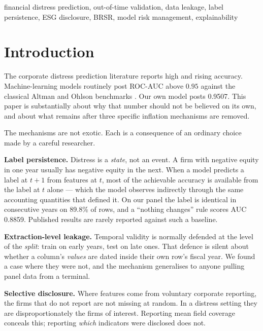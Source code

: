 \documentclass[conference]{IEEEtran}
\begin{document}
\begin{IEEEkeywords}
financial distress prediction, out-of-time validation, data leakage, label
persistence, ESG disclosure, BRSR, model risk management, explainability
\end{IEEEkeywords}

\section{Introduction}

The corporate distress prediction literature reports high and rising accuracy.
Machine-learning models routinely post ROC-AUC above $0.95$ against the
classical Altman and Ohlson benchmarks \cite{altman1968,ohlson1980,barboza2017}.
Our own model posts 0.9507. This paper is substantially about why that number
should not be believed on its own, and about what remains after three specific
inflation mechanisms are removed.

The mechanisms are not exotic. Each is a consequence of an ordinary choice made
by a careful researcher.

\textbf{Label persistence.} Distress is a \emph{state}, not an event. A firm
with negative equity in one year usually has negative equity in the next. When
a model predicts a label at $t+1$ from features at $t$, most of the achievable
accuracy is available from the label at $t$ alone --- which the model observes
indirectly through the same accounting quantities that defined it. On our panel
the label is identical in consecutive years on 89.8\% of rows, and a
``nothing changes'' rule scores AUC 0.8859. Published results are rarely
reported against such a baseline.

\textbf{Extraction-level leakage.} Temporal validity is normally defended at
the level of the \emph{split}: train on early years, test on late ones. That
defence is silent about whether a column's \emph{values} are dated inside
their own row's fiscal year. We found a case where they were not, and the
mechanism generalises to anyone pulling panel data from a terminal.

\textbf{Selective disclosure.} Where features come from voluntary corporate
reporting, the firms that do not report are not missing at random. In a
distress setting they are disproportionately the firms of interest. Reporting
mean field coverage conceals this; reporting \emph{which} indicators were
disclosed does not.
\end{document}
